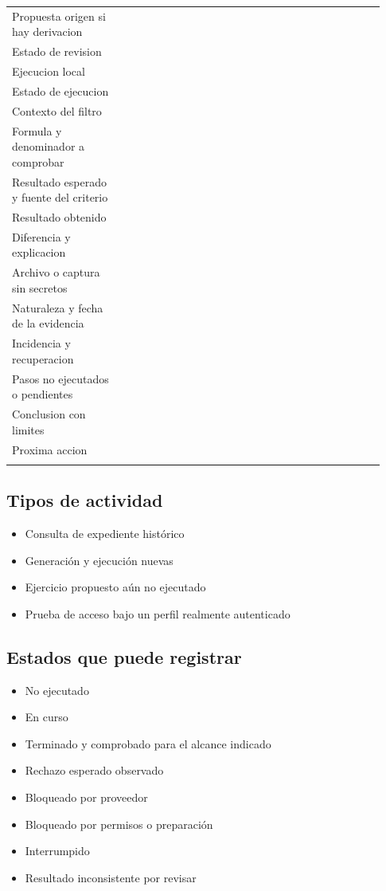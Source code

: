 \begin{longtable}{@{}>{\RaggedRight\arraybackslash}p{0.27\linewidth}>{\RaggedRight\arraybackslash}p{0.66\linewidth}@{}}
\addlinespace[3pt]
Propuesta origen si hay derivacion &          \\
\addlinespace[3pt]
Estado de revision &          \\
\addlinespace[3pt]
Ejecucion local &          \\
\addlinespace[3pt]
Estado de ejecucion &          \\
\addlinespace[3pt]
Contexto del filtro &          \\
\addlinespace[3pt]
Formula y denominador a comprobar &          \\
\addlinespace[3pt]
Resultado esperado y fuente del criterio &          \\
\addlinespace[3pt]
Resultado obtenido &          \\
\addlinespace[3pt]
Diferencia y explicacion &          \\
\addlinespace[3pt]
Archivo o captura sin secretos &          \\
\addlinespace[3pt]
Naturaleza y fecha de la evidencia &          \\
\addlinespace[3pt]
Incidencia y recuperacion &          \\
\addlinespace[3pt]
Pasos no ejecutados o pendientes &          \\
\addlinespace[3pt]
Conclusion con limites &          \\
\addlinespace[3pt]
Proxima accion &          \\
\addlinespace[3pt]
\end{longtable}
\endgroup

\subsection{Tipos de actividad}
\begin{itemize}
\item Consulta de expediente histórico
\item Generación y ejecución nuevas
\item Ejercicio propuesto aún no ejecutado
\item Prueba de acceso bajo un perfil realmente autenticado
\end{itemize}

\subsection{Estados que puede registrar}
\begin{itemize}
\item No ejecutado
\item En curso
\item Terminado y comprobado para el alcance indicado
\item Rechazo esperado observado
\item Bloqueado por proveedor
\item Bloqueado por permisos o preparación
\item Interrumpido
\item Resultado inconsistente por revisar
\end{itemize}

